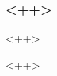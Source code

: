 \documentclass[xcolor=dvipsnames]{beamer}
\title{}
\author{Augustus Gillick}
\begin{document}
\maketitle

\begin{frame}
\frametitle{<++>}
<++>
\end{frame}
<++>
\end{document}

